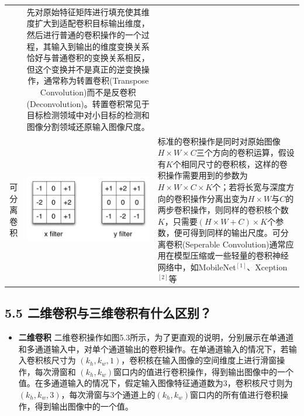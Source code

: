 \begin{longtable}[]{@{}ccl@{}}
\begin{minipage}[t]{0.22\columnwidth}
\end{minipage} & \begin{minipage}[t]{0.46\columnwidth}\raggedright\strut
先对原始特征矩阵进行填充使其维度扩大到适配卷积目标输出维度，然后进行普通的卷积操作的一个过程，其输入到输出的维度变换关系恰好与普通卷积的变换关系相反，但这个变换并不是真正的逆变换操作，通常称为转置卷积(Transpose
Convolution)而不是反卷积(Deconvolution)。转置卷积常见于目标检测领域中对小目标的检测和图像分割领域还原输入图像尺度。\strut
\end{minipage}\tabularnewline
\begin{minipage}[t]{0.23\columnwidth}\centering\strut
可分离卷积\strut
\end{minipage} & \begin{minipage}[t]{0.22\columnwidth}\centering\strut
\includegraphics{./img/ch5/img11.png}\strut
\end{minipage} & \begin{minipage}[t]{0.46\columnwidth}\raggedright\strut
标准的卷积操作是同时对原始图像\(H\times W\times C\)三个方向的卷积运算，假设有\(K\)个相同尺寸的卷积核，这样的卷积操作需要用到的参数为\(H\times W\times C\times K\)个；若将长宽与深度方向的卷积操作分离出变为\(H\times W\)与\(C\)的两步卷积操作，则同样的卷积核个数\(K\)，只需要\((H\times W + C)\times K\)个参数，便可得到同样的输出尺度。可分离卷积(Seperable
Convolution)通常应用在模型压缩或一些轻量的卷积神经网络中，如MobileNet\(^{[1]}\)、Xception\(^{[2]}\)等\strut
\end{minipage}\tabularnewline
\bottomrule
\end{longtable}

\subsection{5.5
二维卷积与三维卷积有什么区别？}\label{ux4e8cux7ef4ux5377ux79efux4e0eux4e09ux7ef4ux5377ux79efux6709ux4ec0ux4e48ux533aux522b}

\begin{itemize}
\tightlist
\item
  \textbf{二维卷积}
  二维卷积操作如图5.3所示，为了更直观的说明，分别展示在单通道和多通道输入中，对单个通道输出的卷积操作。在单通道输入的情况下，若输入卷积核尺寸为
  \((k_h, k_w, 1)​\)，卷积核在输入图像的空间维度上进行滑窗操作，每次滑窗和
  \((k_h, k_w)​\)窗口内的值进行卷积操作，得到输出图像中的一个值。在多通道输入的情况下，假定输入图像特征通道数为3，卷积核尺寸则为\((k_h, k_w, 3)​\)，每次滑窗与3个通道上的\((k_h, k_w)​\)窗口内的所有值进行卷积操作，得到输出图像中的一个值。
\end{itemize}

